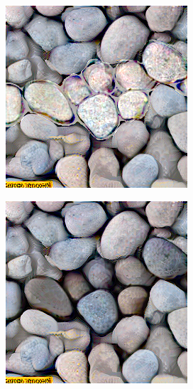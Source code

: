 \begin{figure}[]
\begin{subfigure}{\textwidth}
\begin{subfigure}{0.24\textwidth}
            \caption*{}
        \end{subfigure}
        \hfill
        \begin{subfigure}{0.24\textwidth}
            \centering
            \includegraphics[width=\textwidth]{images/04-experiment01/pebbles/1000/some_im.jpg}
            \caption*{}
        \end{subfigure}
        \hfill
        \begin{subfigure}{0.24\textwidth}
            \centering
            \includegraphics[width=\textwidth]{images/04-experiment01/pebbles/1000/some_proj.jpg}
            \caption*{}
        \end{subfigure}
        

\end{subfigure}
\end{figure}
